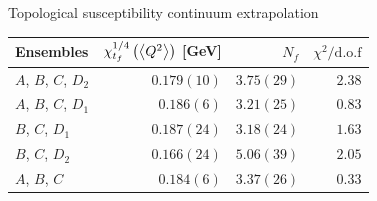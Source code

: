 \documentclass[10pt,show notes on second screen]{beamer}
\begin{document}

\begin{frame}{Topological susceptibility continuum extrapolation}
\begin{table}
    \centering
    \begin{tabular}{l r r r}
        \toprule
        Ensembles               & $\chi_{t_f}^{1/4}\left( \left\langle{Q^2}\right\rangle \right)$ [GeV]   & $N_f$         & $\chi^2/\mathrm{d.o.f}$ \\ \midrule
        $A$, $B$, $C$, $D_2$    & $0.179(10)$                                           & $3.75(29)$    & $2.38$ \\
        $A$, $B$, $C$, $D_1$    & $0.186(6)$                                            & $3.21(25)$    & $0.83$ \\
        $B$, $C$, $D_1$         & $0.187(24)$                                           & $3.18(24)$    & $1.63$ \\ 
        $B$, $C$, $D_2$         & $0.166(24)$                                           & $5.06(39)$    & $2.05$ \\ 
        $A$, $B$, $C$           & $0.184(6)$                                            & $3.37(26)$    & $0.33$ \\
        \bottomrule
    \end{tabular}
\end{table}
\end{frame}
\end{document}
